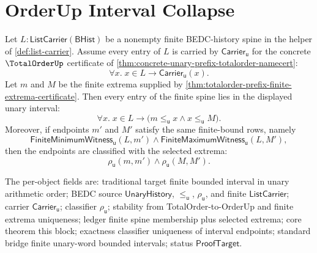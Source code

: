 \section{OrderUp Interval Collapse}
\label{sec:totalorder-orderup-interval-collapse}

\begin{theorem}
\label{thm:unary-prefix-orderup-bounded-interval-collapse}
Let $L:\mathsf{ListCarrier}(\mathsf{BHist})$ be a nonempty finite
BEDC-history spine in the helper of \autoref{def:list-carrier}. Assume every
entry of $L$ is carried by $\mathsf{Carrier}_{\mathsf{u}}$ for the concrete
$\TotalOrderUp$ certificate of
\autoref{thm:concrete-unary-prefix-totalorder-namecert}:
$$
\forall x.\; x\in L\to \mathsf{Carrier}_{\mathsf{u}}(x).
$$
Let $m$ and $M$ be the finite extrema supplied by
\autoref{thm:totalorder-prefix-finite-extrema-certificate}. Then every entry
of the finite spine lies in the displayed unary interval:
$$
\forall x.\; x\in L\to
\bigl(m\le_{\mathsf{u}}x\land x\le_{\mathsf{u}}M\bigr).
$$
Moreover, if endpoints $m'$ and $M'$ satisfy the same finite-bound rows,
namely
$$
\mathsf{FiniteMinimumWitness}_{\mathsf{u}}(L,m')
\land
\mathsf{FiniteMaximumWitness}_{\mathsf{u}}(L,M'),
$$
then the endpoints are classified with the selected extrema:
$$
\rho_{\mathsf{u}}(m,m')
\land
\rho_{\mathsf{u}}(M,M').
$$

The per-object fields are: traditional target finite bounded interval in
unary arithmetic order; BEDC source $\mathsf{UnaryHistory}$,
$\le_{\mathsf{u}}$, $\rho_{\mathsf{u}}$, and finite
$\mathsf{ListCarrier}$; carrier $\mathsf{Carrier}_{\mathsf{u}}$; classifier
$\rho_{\mathsf{u}}$; stability from TotalOrder-to-OrderUp and finite extrema
uniqueness; ledger finite spine membership plus selected extrema; core theorem
this block; exactness classifier uniqueness of interval endpoints; standard
bridge finite unary-word bounded intervals; status $\mathsf{ProofTarget}$.
\end{theorem}
